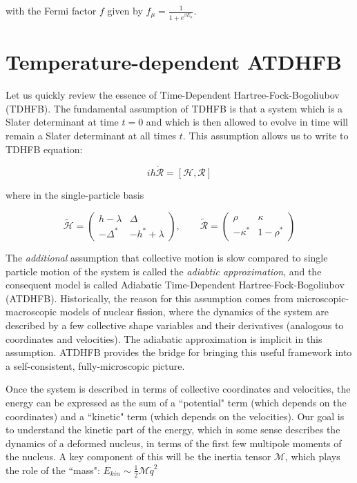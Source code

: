 \noindent with the Fermi factor $f$ given by $f_\mu=\frac{1}{1+e^{\beta E_\mu}}$.

\section{Temperature-dependent ATDHFB}

Let us quickly review the essence of Time-Dependent Hartree-Fock-Bogoliubov (TDHFB). The fundamental assumption of TDHFB is that a system which is a Slater determinant at time $t=0$ and which is then allowed to evolve in time will remain a Slater determinant at all times $t$. This assumption allows us to write to TDHFB equation:

\begin{equation}\label{eq:TDHFB}
i\hbar \mathcal{\dot{R}} = \left[\mathcal{H},\mathcal{R}\right]
\end{equation}

\noindent where in the single-particle basis

\begin{equation}
\mathcal{\tilde{H}} = 
\left(\begin{array}{cc}
h-\lambda & \Delta \\
-\Delta^* & -h^*+\lambda
\end{array}\right), 
\qquad \mathcal{\tilde{R}} = 
\left(\begin{array}{cc}
\rho & \kappa \\
-\kappa^* & 1-\rho^*
\end{array}\right)
\end{equation}

The \textit{additional} assumption that collective motion is slow compared to single particle motion of the system is called the \textit{adiabtic approximation}, and the consequent model is called Adiabatic Time-Dependent Hartree-Fock-Bogoliubov (ATDHFB). Historically, the reason for this assumption comes from microscopic-macroscopic models of nuclear fission, where the dynamics of the system are described by a few collective shape variables and their derivatives (analogous to coordinates and velocities). The adiabatic approximation is implicit in this assumption. ATDHFB provides the bridge for bringing this useful framework into a self-consistent, fully-microscopic picture.

Once the system is described in terms of collective coordinates and velocities, the energy can be expressed as the sum of a ``potential" term (which depends on the coordinates) and a ``kinetic" term (which depends on the velocities). Our goal is to understand the kinetic part of the energy, which in some sense describes the dynamics of a deformed nucleus, in terms of the first few multipole moments of the nucleus. A key component of this will be the inertia tensor $\mathcal{M}$, which plays the role of the ``mass": $E_{kin}\sim\frac{1}{2}\mathcal{M}\dot{q}^2$

